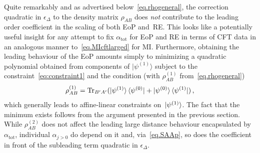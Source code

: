 \documentclass[prl,a4paper,notitlepage,twocolumn,superscriptaddress,longbibliography,reprint]{revtex4-2}
\begin{document}
Quite remarkably and as advertised below~\eqref{eq.rhogeneral}, the correction quadratic in $\epsilon_{\Delta}$ to the density matrix $\rho_{AB}$ does \emph{not} contribute to the leading order coefficient in the scaling of both EoP and~RE. This looks like a potentially useful insight for any attempt to fix $\alpha_{\text{tot}}$ for EoP and RE in terms of CFT data in an analogous manner to~\eqref{eq.MIcftlarged} for MI. Furthermore, obtaining the leading behaviour of the EoP amounts simply to minimizing a quadratic polynomial obtained from components of $|\psi^{(1)} \rangle$ subject to the constraint~\eqref{eq:constraint1} and the condition (with $\rho_{AB}^{(1)}$ from~\eqref{eq.rhogeneral})
\begin{align}
    \rho_{AB}^{(1)}=\mathrm{Tr}_{B'A'}(\ket{\psi^{(1)}}\bra{\psi^{(0)}}+\ket{\psi^{(0)}}\bra{\psi^{(1)}})\,,\label{eq:affine-lin}
\end{align}
which generally leads to affine-linear constraints on~$\ket{\psi^{(1)}}$. The fact that the minimum exists follows from the argument presented in the previous section. While $\rho_{AB}^{(2)}$ does not affect the leading large distance behaviour encapsulated by $\alpha_{\text{tot}}$, individual $\alpha_{j>0}$ do depend on it and, via~\eqref{eq.SAAp}, so does the coefficient in front of the subleading term quadratic in $\epsilon_{\Delta}$.
\end{document}

